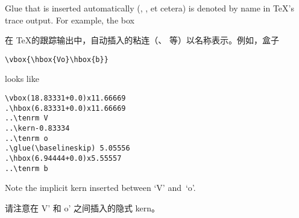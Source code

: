 Glue that is inserted automatically (, ,
et cetera) is denoted by name in \TeX's trace output.
For example, the box

在 \TeX 的跟踪输出中，自动插入的粘连（、 等）以名称表示。例如，盒子
\begin{verbatim}
\vbox{\hbox{Vo}\hbox{b}}
\end{verbatim}
looks like
\begin{verbatim}
\vbox(18.83331+0.0)x11.66669
.\hbox(6.83331+0.0)x11.66669
..\tenrm V
..\kern-0.83334
..\tenrm o
.\glue(\baselineskip) 5.05556
.\hbox(6.94444+0.0)x5.55557
..\tenrm b
\end{verbatim}
Note the implicit kern inserted between `V' and~`o'.

请注意在 V' 和 o' 之间插入的隐式 kern。


